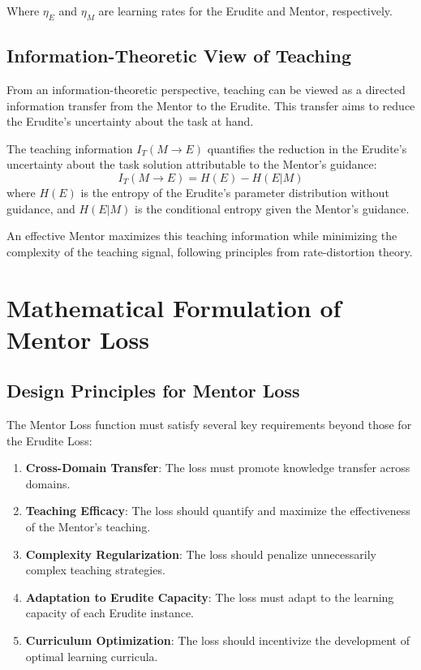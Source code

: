 Where $\eta_E$ and $\eta_M$ are learning rates for the Erudite and Mentor, respectively.

\subsection{Information-Theoretic View of Teaching}

From an information-theoretic perspective, teaching can be viewed as a directed information transfer from the Mentor to the Erudite. This transfer aims to reduce the Erudite's uncertainty about the task at hand.

\begin{definition}
The teaching information $I_T(M \rightarrow E)$ quantifies the reduction in the Erudite's uncertainty about the task solution attributable to the Mentor's guidance:
\begin{equation}
I_T(M \rightarrow E) = H(E) - H(E|M)
\end{equation}
where $H(E)$ is the entropy of the Erudite's parameter distribution without guidance, and $H(E|M)$ is the conditional entropy given the Mentor's guidance.
\end{definition}

An effective Mentor maximizes this teaching information while minimizing the complexity of the teaching signal, following principles from rate-distortion theory.

\section{Mathematical Formulation of Mentor Loss}

\subsection{Design Principles for Mentor Loss}

The Mentor Loss function must satisfy several key requirements beyond those for the Erudite Loss:

\begin{enumerate}
\item \textbf{Cross-Domain Transfer}: The loss must promote knowledge transfer across domains.

\item \textbf{Teaching Efficacy}: The loss should quantify and maximize the effectiveness of the Mentor's teaching.

\item \textbf{Complexity Regularization}: The loss should penalize unnecessarily complex teaching strategies.

\item \textbf{Adaptation to Erudite Capacity}: The loss must adapt to the learning capacity of each Erudite instance.

\item \textbf{Curriculum Optimization}: The loss should incentivize the development of optimal learning curricula.
\end{enumerate}

